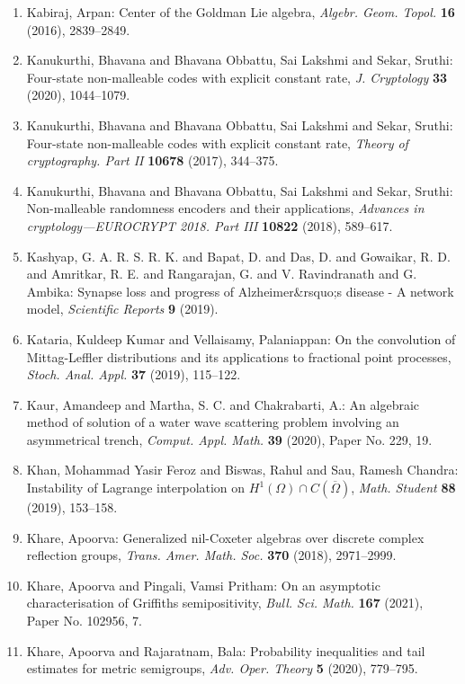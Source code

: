 \begin{enumerate}
\item Kabiraj, Arpan: Center of the {G}oldman {L}ie algebra, \emph{Algebr. Geom. Topol.} {\bf 16} (2016), 2839--2849.
\item Kanukurthi, Bhavana and Bhavana Obbattu, Sai Lakshmi and
Sekar, Sruthi: Four-state non-malleable codes with explicit constant rate, \emph{J. Cryptology} {\bf 33} (2020), 1044--1079.
\item Kanukurthi, Bhavana and Bhavana Obbattu, Sai Lakshmi and
Sekar, Sruthi: Four-state non-malleable codes with explicit constant rate, \emph{Theory of cryptography. {P}art {II}} {\bf 10678} (2017), 344--375.
\item Kanukurthi, Bhavana and Bhavana Obbattu, Sai Lakshmi and
Sekar, Sruthi: Non-malleable randomness encoders and their applications, \emph{Advances in cryptology---{EUROCRYPT} 2018. {P}art {III}} {\bf 10822} (2018), 589--617.
\item Kashyap, G. A. R. S. R. K. and Bapat, D. and Das, D. and Gowaikar, R. D. and  Amritkar, R. E. and Rangarajan, G. and V. Ravindranath and G. Ambika: Synapse loss and progress of Alzheimer&rsquo;s disease - A network model, \emph{Scientific Reports} {\bf 9} (2019).
\item Kataria, Kuldeep Kumar and Vellaisamy, Palaniappan: On the convolution of {M}ittag-{L}effler distributions and its
applications to fractional point processes, \emph{Stoch. Anal. Appl.} {\bf 37} (2019), 115--122.
\item Kaur, Amandeep and Martha, S. C. and Chakrabarti, A.: An algebraic method of solution of a water wave scattering
problem involving an asymmetrical trench, \emph{Comput. Appl. Math.} {\bf 39} (2020), Paper No. 229, 19.
\item Khan, Mohammad Yasir Feroz and Biswas, Rahul and Sau, Ramesh
Chandra: Instability of {L}agrange interpolation on {$H^1(\Omega)\cap
C(\overline\Omega)$}, \emph{Math. Student} {\bf 88} (2019), 153--158.
\item Khare, Apoorva: Generalized nil-{C}oxeter algebras over discrete complex
reflection groups, \emph{Trans. Amer. Math. Soc.} {\bf 370} (2018), 2971--2999.
\item Khare, Apoorva and Pingali, Vamsi Pritham: On an asymptotic characterisation of {G}riffiths
semipositivity, \emph{Bull. Sci. Math.} {\bf 167} (2021), Paper No. 102956, 7.
\item Khare, Apoorva and Rajaratnam, Bala: Probability inequalities and tail estimates for metric
semigroups, \emph{Adv. Oper. Theory} {\bf 5} (2020), 779--795.

\end{enumerate}
